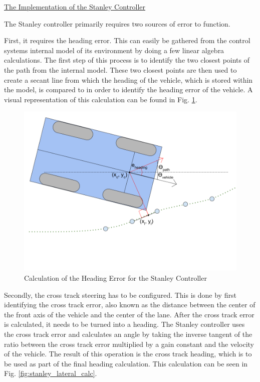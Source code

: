 \documentclass[titlepage,draft]{article}
\begin{document}
{\underline{The Implementation of the Stanley Controller}

The Stanley controller primarily requires two sources of error to function.

First, it requires the heading error. This can easily be gathered from the control systems internal model of its environment by doing a few linear algebra calculations. The first step of this process is to identify the two closest points of the path from the internal model. These two closest points are then used to create a secant line from which the heading of the vehicle, which is stored within the model, is compared to in order to identify the heading error of the vehicle. A visual representation of this calculation can be found in Fig. \ref{fig:stanley_heading_calc}.

\begin{figure}
	\centering
	\includegraphics[width=5in]{stanley_heading_error}
	\caption{Calculation of the Heading Error for the Stanley Controller}
	\label{fig:stanley_heading_calc}
\end{figure}

Secondly, the cross track steering has to be configured. This is done by first identifying the cross track error, also known as the distance between the center of the front axis of the vehicle and the center of the lane. After the cross track error is calculated, it needs to be turned into a heading. The Stanley controller uses the cross track error and calculates an angle by taking the inverse tangent of the ratio between the cross track error multiplied by a gain constant and the velocity of the vehicle. The result of this operation is the cross track heading, which is to be used as part of the final heading calculation. This calculation can be seen in Fig. \ref{fig:stanley_lateral_calc}.

}
\end{document}
